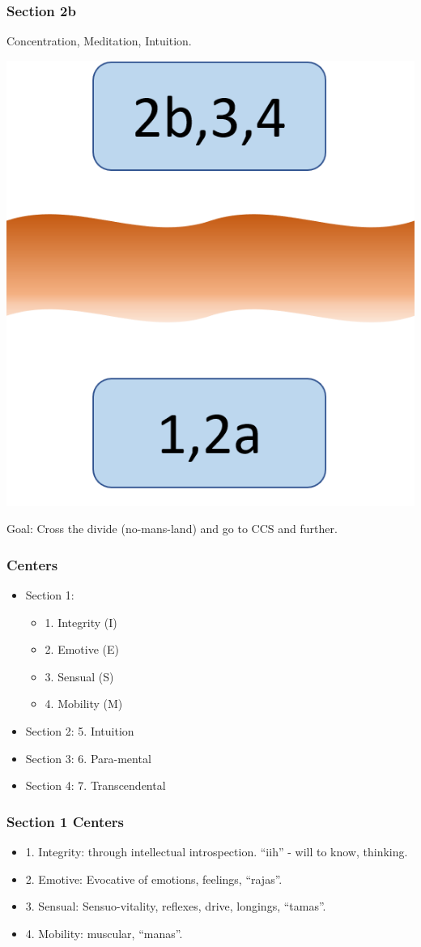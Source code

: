 \begin{frame}[fragile]
\frametitle{Section 2b}
Concentration, Meditation, Intuition.

 \begin{center}
\includegraphics[width=0.35\linewidth,keepaspectratio]{images/zenyoga2}
\end{center}

Goal: Cross the divide (no-mans-land) and go to CCS and further.

\end{frame}

\begin{frame}[fragile]
\frametitle{Centers}

\begin{itemize}
\item Section 1:
\begin{itemize}
\item 1. Integrity (I)
\item 2. Emotive (E)
\item 3. Sensual (S)
\item 4. Mobility (M)
\end{itemize}
\item Section 2: 5. Intuition
\item Section 3: 6. Para-mental
\item Section 4: 7. Transcendental
\end{itemize}

\end{frame}


\begin{frame}[fragile]
\frametitle{Section 1 Centers}

\begin{itemize}
\item 1. Integrity: through intellectual introspection. ``iih'' - will to know, thinking.
\item 2. Emotive: Evocative of emotions, feelings, ``rajas''.
\item 3. Sensual: Sensuo-vitality, reflexes, drive, longings, ``tamas''.
\item 4. Mobility: muscular, ``manas''.
\end{itemize}


\end{frame}

